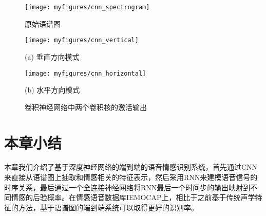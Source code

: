 \begin{figure}[htb] %
    \centering
    \texttt{[image: myfigures/cnn\_spectrogram]}
    \caption{原始语谱图}
    \label{fig:cnn_spectrogram}
\end{figure}

\begin{figure}[htb]
    \begin{minipage}{0.48\textwidth}
        \centering
        \texttt{[image: myfigures/cnn\_vertical]}
        \centerline{(a) 垂直方向模式}\medskip
    \end{minipage}\hfill
    \begin{minipage}{0.48\textwidth}
        \centering
        \texttt{[image: myfigures/cnn\_horizontal]}
        \centerline{(b) 水平方向模式}\medskip
    \end{minipage}
\caption{卷积神经网络中两个卷积核的激活输出}
\label{fig:cnn_activation}
\end{figure}

\section{本章小结}
\label{sec:end2end_summary}

本章我们介绍了基于深度神经网络的端到端的语音情感识别系统，首先通过CNN来直接从语谱图上抽取和情感相关的特征表示，然后采用RNN来建模语音信号的时序关系，最后通过一个全连接神经网络将RNN最后一个时间步的输出映射到不同情感的后验概率。在情感语音数据库IEMOCAP上，相比于之前基于传统声学特征的方法，基于语谱图的端到端系统可以取得更好的识别率。